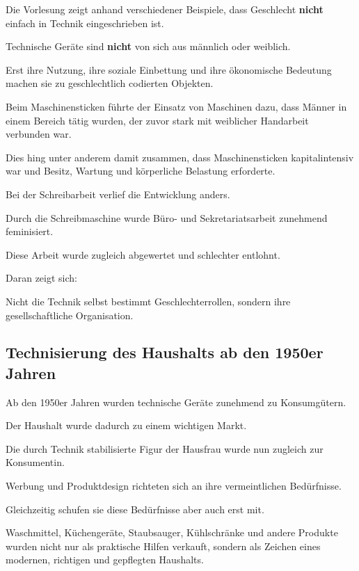 Die Vorlesung zeigt anhand verschiedener Beispiele,
dass Geschlecht \textbf{nicht} einfach in Technik eingeschrieben ist.

Technische Geräte sind \textbf{nicht} von sich aus männlich oder weiblich.

Erst ihre Nutzung,
ihre soziale Einbettung
und ihre ökonomische Bedeutung
machen sie zu geschlechtlich codierten Objekten.

Beim Maschinensticken führte der Einsatz von Maschinen dazu,
dass Männer in einem Bereich tätig wurden,
der zuvor stark mit weiblicher Handarbeit verbunden war.

Dies hing unter anderem damit zusammen,
dass Maschinensticken kapitalintensiv war
und Besitz,
Wartung und körperliche Belastung erforderte.

Bei der Schreibarbeit verlief die Entwicklung anders.

Durch die Schreibmaschine wurde Büro- und Sekretariatsarbeit
zunehmend feminisiert.

Diese Arbeit wurde zugleich abgewertet
und schlechter entlohnt.

Daran zeigt sich:

Nicht die Technik selbst bestimmt Geschlechterrollen,
sondern ihre gesellschaftliche Organisation.


\subsection{Technisierung des Haushalts ab den 1950er Jahren}

Ab den 1950er Jahren wurden technische Geräte
zunehmend zu Konsumgütern.

Der Haushalt wurde dadurch zu einem wichtigen Markt.

Die durch Technik stabilisierte Figur der Hausfrau
wurde nun zugleich zur Konsumentin.

Werbung und Produktdesign richteten sich
an ihre vermeintlichen Bedürfnisse.

Gleichzeitig schufen sie diese Bedürfnisse
aber auch erst mit.

Waschmittel,
Küchengeräte,
Staubsauger,
Kühlschränke und andere Produkte
wurden nicht nur als praktische Hilfen verkauft,
sondern als Zeichen eines modernen,
richtigen und gepflegten Haushalts.

